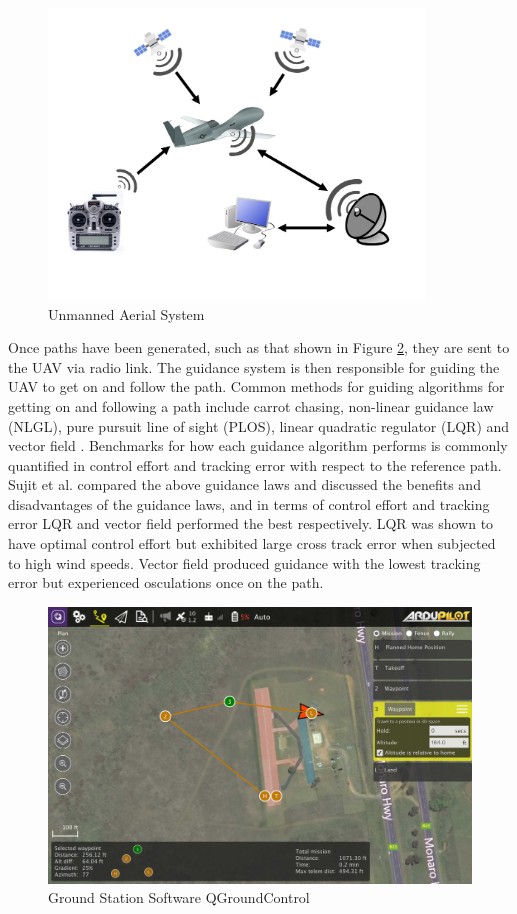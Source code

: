 \documentclass[numbered,pdftex]{ohio-etd}
\begin{document}
\begin{figure}[H]
	\centering
	\includegraphics[width=10cm]{PaperFigures/UAS}
	\caption{Unmanned Aerial System}
	\label{fig:uas}
\end{figure}

Once paths have been generated, such as that shown in Figure \ref{fig:qground}, they are sent to the UAV via radio link. The guidance system is then responsible for guiding the UAV to get on and follow the path. Common methods for guiding algorithms for getting on and following a path include carrot chasing, non-linear guidance law (NLGL), pure pursuit line of sight (PLOS), linear quadratic regulator (LQR) and vector field \cite{sujit_unmanned_2014}. Benchmarks for how each guidance algorithm performs is commonly quantified in control effort and tracking error with respect to the reference path. Sujit et al. compared the above guidance laws and discussed the benefits and disadvantages of the guidance laws, and in terms of control effort and tracking error LQR and vector field performed the best respectively. LQR was shown to have optimal control effort but exhibited large cross track error when subjected to high wind speeds. Vector field produced guidance with the lowest tracking error but experienced osculations once on the path. 


\begin{figure}[H]
	\centering
	\includegraphics[width=15cm]{PaperFigures/qGround}
	\caption{Ground Station Software QGroundControl}
	\label{fig:qground}
\end{figure}
\end{document}

